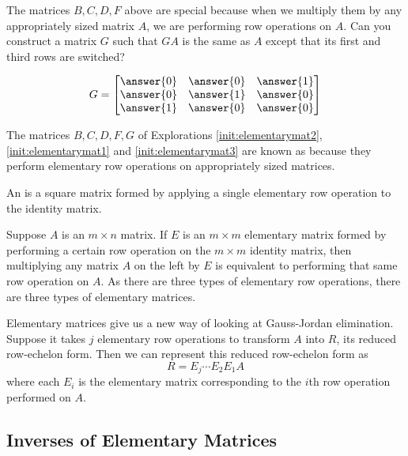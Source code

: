 \documentclass{ximera}
\begin{document}
 
\begin{exploration}\label{init:elementarymat3}
 The matrices $B,C,D,F$ above are special because when we multiply them by any appropriately sized matrix $A$, we are performing row operations on $A$.  Can you construct a matrix $G$ such that $GA$ is the same as $A$ except that its first and third rows are switched?
 
 $$G=\begin{bmatrix}\answer{0} & \answer{0} & \answer{1} \\ \answer{0} & \answer{1} & \answer{0}\\ \answer{1} & \answer{0} & \answer{0}\end{bmatrix}$$

\end{exploration}


The matrices $B,C,D, F, G$ of Explorations \ref{init:elementarymat2}, \ref{init:elementarymat1} and \ref{init:elementarymat3} are known as  because they perform elementary row operations on appropriately sized matrices.

\begin{definition} \label{def:elemmatrix}
  
An  is a square matrix formed by applying a single elementary row operation to the identity matrix.
  
\end{definition}

Suppose $A$ is an $m \times n$ matrix.  If $E$ is an $m \times m$ elementary matrix formed by performing a certain row operation on the $m \times m$ identity matrix, then multiplying any matrix $A$ on the left by $E$ is equivalent to performing that same row operation on $A$.  As there are three types of elementary row operations, there are three types of elementary matrices.

Elementary matrices give us a new way of looking at Gauss-Jordan elimination.  Suppose it takes $j$ elementary row operations to transform $A$ into $R$, its reduced row-echelon form.  Then we can represent this reduced row-echelon form as
$$R = E_j \cdots E_2 E_1 A$$
where each $E_i$ is the elementary matrix corresponding to the $i$th row operation performed on $A$.  

\subsection*{Inverses of Elementary Matrices}
\end{document}
